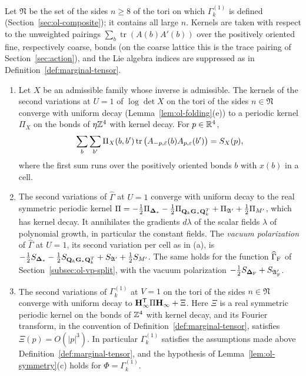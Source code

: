 \begin{lemma}\label{lem:ol-torus-limit}
Let $\mathfrak N$ be the set of the sides $n\ge8$ of the tori on which $\Gamma^{(1)}_k$ is defined (Section~\ref{sec:ol-composite}); it contains all large $n$. Kernels are taken with respect to the unweighted pairings $\sum_b\operatorname{tr}(A(b)A'(b))$ over the positively oriented fine, respectively coarse, bonds (on the coarse lattice this is the trace pairing of Section~\ref{sec:action}), and the Lie algebra indices are suppressed as in Definition~\ref{def:marginal-tensor}.
\begin{enumerate}[label=(\alph*)]
\item Let $X$ be an admissible family whose inverse is admissible. The kernels of the second variations at $U=1$ of $\log\det X$ on the tori of the sides $n\in\mathfrak N$ converge with uniform decay (Lemma~\ref{lem:ol-folding}(e)) to a periodic kernel $\Pi_X$ on the bonds of $\eta\mathbb Z^4$ with kernel decay. For $p\in\mathbb R^4$,
\[
\sum_b\sum_{b'}\Pi_X(b,b')\operatorname{tr}\big(A_{-p,\bar{\varepsilon}}(b)A_{p,\varepsilon}(b')\big)=S_X(p),
\]
where the first sum runs over the positively oriented bonds $b$ with $x(b)$ in a cell.
\item The second variations of $\widehat\Gamma$ at $U=1$ converge with uniform decay to the real symmetric periodic kernel $\Pi=-\frac12\Pi_{\boldsymbol{\Delta}_*}-\frac12\Pi_{\mathbf Q_k\mathbf G_*\mathbf Q_k^T}+\Pi_{\mathfrak A'}+\frac12\Pi_{M'}$, which has kernel decay. It annihilates the gradients $d\lambda$ of the scalar fields $\lambda$ of polynomial growth, in particular the constant fields. The \emph{vacuum polarization} of $\widehat\Gamma$ at $U=1$, its second variation per cell as in (a), is $-\frac12S_{\boldsymbol{\Delta}_*}-\frac12S_{\mathbf Q_k\mathbf G_*\mathbf Q_k^T}+S_{\mathfrak A'}+\frac12S_{M'}$. The same holds for the function $\widehat\Gamma_{\rm F}$ of Section~\ref{subsec:ol-vp-split}, with the vacuum polarization $-\frac12S_{\boldsymbol{\Delta}_{\rm F}}+S_{\mathfrak A'_{\rm F}}$.
\item The second variations of $\Gamma^{(1)}_k$ at $V=1$ on the tori of the sides $n\in\mathfrak N$ converge with uniform decay to $\mathbf H_\infty^{\sf T}\Pi\mathbf H_\infty+\Xi$. Here $\Xi$ is a real symmetric periodic kernel on the bonds of $\mathbb Z^4$ with kernel decay, and its Fourier transform, in the convention of Definition~\ref{def:marginal-tensor}, satisfies $\Xi(p)=O(|p|^3)$. In particular $\Gamma^{(1)}_k$ satisfies the assumptions made above Definition~\ref{def:marginal-tensor}, and the hypothesis of Lemma~\ref{lem:ol-symmetry}(c) holds for $\Phi=\Gamma^{(1)}_k$.
\end{enumerate}
\end{lemma}

